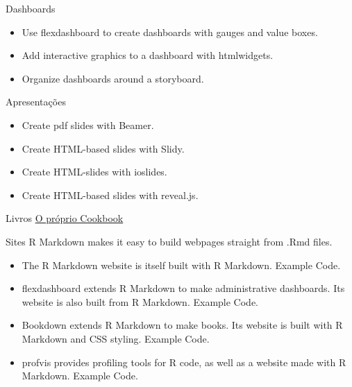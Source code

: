\documentclass[
  9pt,
  ignorenonframetext,
]{beamer}
\begin{document}
\begin{frame}{Dashboards}
\protect\hypertarget{dashboards}{}
\begin{itemize}
\item
  Use flexdashboard to create dashboards with gauges and value boxes.
\item
  Add interactive graphics to a dashboard with htmlwidgets.
\item
  Organize dashboards around a storyboard.
\end{itemize}
\end{frame}

\begin{frame}{Apresentações}
\protect\hypertarget{apresentauxe7uxf5es}{}
\begin{itemize}
\item
  Create pdf slides with Beamer.
\item
  Create HTML-based slides with Slidy.
\item
  Create HTML-slides with ioslides.
\item
  Create HTML-based slides with reveal.js.
\end{itemize}
\end{frame}

\begin{frame}{Livros}
\protect\hypertarget{livros}{}
\href{https://bookdown.org/yihui/rmarkdown-cookbook/}{O próprio
Cookbook}
\end{frame}

\begin{frame}{Sites}
\protect\hypertarget{sites}{}
R Markdown makes it easy to build webpages straight from .Rmd files.

\begin{itemize}
\item
  The R Markdown website is itself built with R Markdown. Example Code.
\item
  flexdashboard extends R Markdown to make administrative dashboards.
  Its website is also built from R Markdown. Example Code.
\item
  Bookdown extends R Markdown to make books. Its website is built with R
  Markdown and CSS styling. Example Code.
\item
  profvis provides profiling tools for R code, as well as a website made
  with R Markdown. Example Code.
\end{itemize}
\end{frame}
\end{document}
